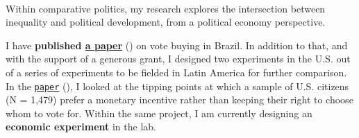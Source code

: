 \documentclass[10pt,stdletter,dateno,sigleft]{newlfm} %
\begin{document}
\begin{newlfm}




\vspace{-2cm}{\bf \huge Research Statement}\\

Within comparative politics, my research explores the intersection between inequality and political development, from a political economy perspective. %


I have {\bf published \href{https://journals.sub.uni-hamburg.de/giga/jpla/article/view/1121/1128}{a paper}} (\emph{\unskip}) on vote buying in Brazil. \unskip In addition to that, and with the support of a generous grant, I designed two experiments in the U.S. out of a series of experiments to be fielded in Latin America for further comparison. In the \href{https://github.com/hbahamonde/Vote_Selling/raw/master/Bahamonde_VoteSellingUS.pdf}{\texttt{paper}} (\emph{\unskip}), I looked at the tipping points at which a sample of U.S. citizens (N = 1,479) prefer a monetary incentive rather than keeping their right to choose whom to vote for. \unskip Within the same project, I am currently designing an {\bf economic experiment} in the lab. \unskip




\end{newlfm}
\end{document}
